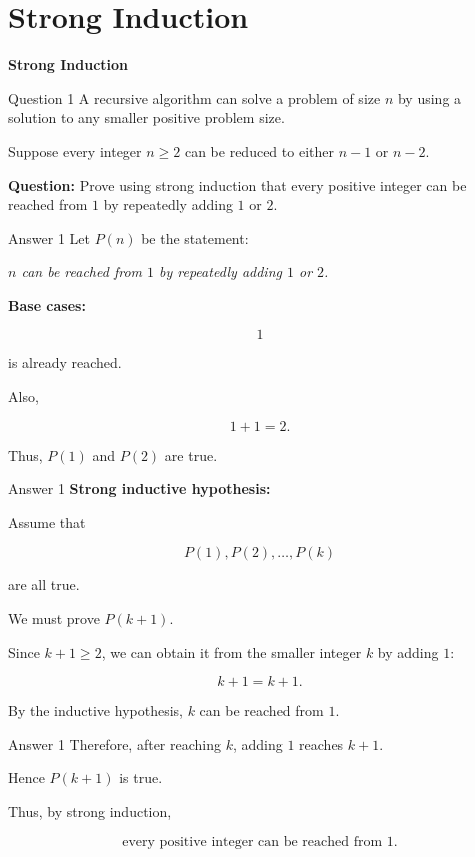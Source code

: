 \section{Strong Induction}

\begin{frame}
\centering
\Huge\textbf{Strong Induction}
\end{frame}


\begin{frame}{Question 1}
A recursive algorithm can solve a problem of size $n$ by using a solution to any smaller positive problem size.

Suppose every integer $n\geq2$ can be reduced to either $n-1$ or $n-2$.

\textbf{Question:} Prove using strong induction that every positive integer can be reached from $1$ by repeatedly adding $1$ or $2$.
\end{frame}

\begin{frame}{Answer 1}
Let $P(n)$ be the statement:

\textit{$n$ can be reached from $1$ by repeatedly adding $1$ or $2$.}

\textbf{Base cases:}

$$
1
$$

is already reached.

Also,

$$
1+1=2.
$$

Thus, $P(1)$ and $P(2)$ are true.
\end{frame}

\begin{frame}{Answer 1}
\textbf{Strong inductive hypothesis:}

Assume that

$$
P(1),P(2),\ldots,P(k)
$$

are all true.

We must prove $P(k+1)$.

Since $k+1\geq2$, we can obtain it from the smaller integer $k$ by adding $1$:

$$
k+1=k+1.
$$

By the inductive hypothesis, $k$ can be reached from $1$.
\end{frame}

\begin{frame}{Answer 1}
Therefore, after reaching $k$, adding $1$ reaches $k+1$.

Hence $P(k+1)$ is true.

Thus, by strong induction,

$$
\boxed{\text{every positive integer can be reached from }1.}
$$

\end{frame}

